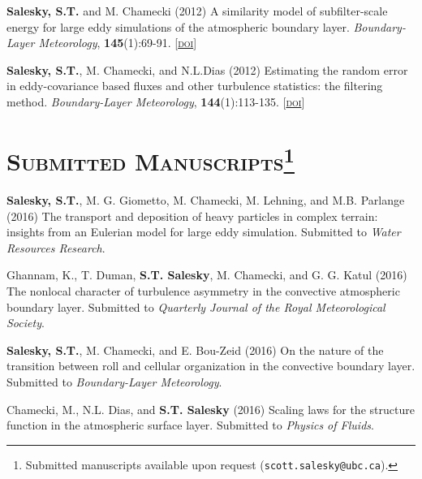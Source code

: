 \documentclass[11pt,letterpaper]{article}
\begin{document}
\textbf{Salesky, S.T.} and M. Chamecki  (2012) A similarity model of subfilter-scale energy for large eddy simulations of the atmospheric boundary layer. \textit{Boundary-Layer Meteorology}, \textbf{145}(1):69-91. [\href{http://doi.org/10.1007/s10546-011-9618-0}{\textsc{doi}}]

\textbf{Salesky, S.T.}, M. Chamecki, and N.L.Dias (2012) Estimating the random error in eddy-covariance based fluxes and other turbulence statistics: the filtering method. \textit{Boundary-Layer Meteorology}, \textbf{144}(1):113-135. [\href{http://doi.org/10.1007/s10546-012-9710-0}{\textsc{doi}}]



\section*{\textsc{Submitted Manuscripts}\footnote[2]{Submitted manuscripts available upon request (\texttt{scott.salesky@ubc.ca}).}}

\textbf{Salesky, S.T.}, M. G. Giometto, M. Chamecki, M. Lehning, and M.B. Parlange (2016) 
The transport and deposition of heavy particles in complex terrain: insights from an Eulerian model
for large eddy simulation. Submitted to \textit{Water Resources Research}.

Ghannam, K., T. Duman, \textbf{S.T. Salesky}, M. Chamecki, and G. G. Katul (2016)
The nonlocal character of turbulence asymmetry in the convective atmospheric boundary
layer. Submitted to \textit{Quarterly Journal of the Royal Meteorological Society}.

\textbf{Salesky, S.T.}, M. Chamecki, and E. Bou-Zeid (2016) On the nature of the transition
between roll and cellular organization in the convective boundary layer. Submitted to
\textit{Boundary-Layer Meteorology}.

Chamecki, M., N.L. Dias, and \textbf{S.T. Salesky} (2016) Scaling laws for 
the structure function in the atmospheric surface layer. Submitted to 
     \textit{Physics of Fluids}.
\end{document}
